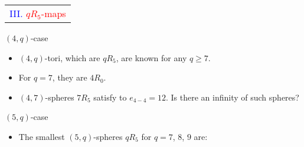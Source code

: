 \documentclass[%
pdf,
colorBG,
slideColor,
]{prosper}
\begin{document}
\begin{slide}{}
\begin{center}
{\Huge 
\begin{tabular*}{7cm}{c}
\\[-0.5cm]
\textcolor{blue}{III. }\textcolor{red}{$qR_5$-maps}
\end{tabular*}
}
\end{center}
\end{slide}


\begin{slide}{$(4,q)$-case}
\begin{itemize}
\item $(4,q)$-tori, which are $qR_5$, are known for any $q\geq 7$.
\item For $q=7$, they are $4R_0$.
\item $(4,7)$-spheres $7R_5$ satisfy to $e_{4-4}=12$. Is there an 
infinity of such spheres?
\begin{center}
\begin{minipage}{3.5cm}
\centering
{}\par
\end{minipage}
\end{center}

\end{itemize}
\end{slide}




\begin{slide}{$(5,q)$-case}
\begin{itemize}
\item The smallest $(5,q)$-spheres $qR_5$ for $q=7$, $8$, $9$ are:
\begin{center}
\begin{minipage}{4.0cm}
\centering
{}\par
\end{minipage}
\hspace{2.0cm}
\begin{minipage}{4.0cm}
\centering
{}\par
\end{minipage}
\end{center}
\vspace{-17mm}
\begin{center}
\begin{minipage}{4.0cm}
\centering
{}\par
\end{minipage}
\end{center}

\end{itemize}
\end{slide}
\end{document}

